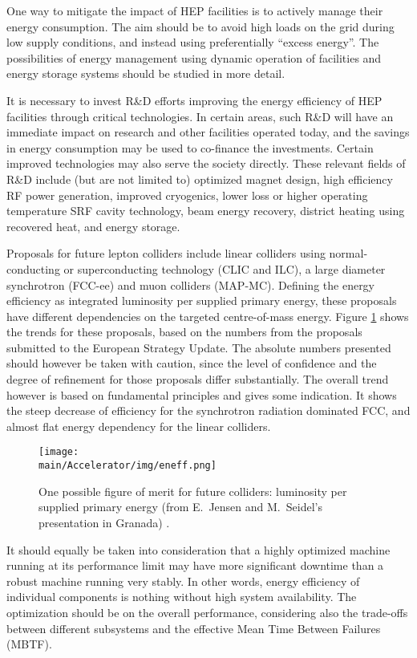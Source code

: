 One way to mitigate the impact of HEP facilities is to actively manage their energy consumption. The aim should be to avoid high loads on the grid during low supply conditions, and instead using preferentially ``excess energy''. The possibilities of energy management using dynamic operation of facilities and energy storage systems should be studied in more detail.

It is necessary to invest R\&D efforts improving the energy efficiency of HEP facilities through critical technologies. In certain areas, such R\&D will have an immediate impact on research and other facilities operated today, and the savings in energy consumption may be used to co-finance the investments. Certain improved technologies may also serve the society directly. These relevant fields of R\&D include (but are not limited to) optimized magnet design, high efficiency RF power generation, improved cryogenics, lower loss or higher operating temperature SRF cavity technology, beam energy recovery, district heating using recovered heat, and energy storage.

Proposals for future lepton colliders include linear colliders using normal-conducting or superconducting technology (CLIC and ILC), a large diameter synchrotron (FCC-ee) and muon colliders (MAP-MC). Defining the energy efficiency as integrated luminosity per supplied primary energy, these proposals have different dependencies on the targeted centre-of-mass energy. Figure \ref{fig9} shows the trends for these proposals, based on the numbers from the proposals submitted to the European Strategy Update. The absolute numbers presented should however be taken with caution, since the level of confidence and the degree of refinement for those proposals differ substantially. The overall trend however is based on fundamental principles and gives some indication. It shows the steep decrease of efficiency for the synchrotron radiation dominated FCC, and almost flat energy dependency for the linear colliders.


 \begin{figure}[ht]
 \centering
 \texttt{[image: \\main/Accelerator/img/eneff.png]}
\caption{One possible figure of merit for future colliders: luminosity per supplied primary energy (from E.~Jensen and M.~Seidel's presentation in Granada) \cite{jensen-granada}.}
\label{fig9}
\end{figure}


It should equally be taken into consideration that a highly optimized machine running   at its performance limit may have more significant downtime than a robust machine running very stably. In other words, energy efficiency of individual components is nothing without high system availability. The optimization should be on the overall performance, considering also the trade-offs between different subsystems and the effective Mean Time Between Failures (MBTF).


